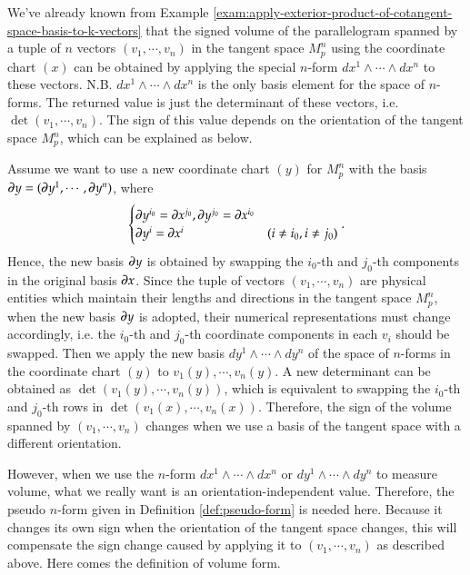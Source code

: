 \documentclass[11pt, a4paper]{book}
\begin{document}
We've already known from Example
\ref{exam:apply-exterior-product-of-cotangent-space-basis-to-k-vectors} that the signed
volume of the parallelogram spanned by a tuple of $n$ vectors $(v_1,\cdots,v_n)$ in the
tangent space $M_{p}^n$ using the coordinate chart $(x)$ can be obtained by applying
the special $n$-form $dx^1 \wedge \cdots \wedge dx^n$ to these vectors. N.B.
$dx^1 \wedge \cdots \wedge dx^n$ is the only basis element for the space of $n$-forms. The
returned value is just the determinant of these vectors, i.e. $\det(v_1,\cdots,v_n)$. The
sign of this value depends on the orientation of the tangent space $M_p^n$, which can
be explained as below.

Assume we want to use a new coordinate chart $(y)$ for $M_{p}^n$ with the basis
$\boldsymbol{\partial}y = (\boldsymbol{\partial}y^1,\cdots,\boldsymbol{\partial}y^n)$, where
\begin{equation*}
  \begin{cases}
    \boldsymbol{\partial}y^{i_0} = \boldsymbol{\partial}x^{j_0}, \boldsymbol{\partial}y^{j_0} =
    \boldsymbol{\partial}x^{i_0} \\
    \boldsymbol{\partial}y^i = \boldsymbol{\partial}x^i & (i \neq i_0, i\neq j_0)
  \end{cases}.
\end{equation*}
Hence, the new basis $\boldsymbol{\partial}y$ is obtained by swapping the $i_0$-th and $j_0$-th
components in the original basis $\boldsymbol{\partial}x$. Since the tuple of vectors
$(v_1,\cdots,v_n)$ are physical entities which maintain their lengths and directions in
the tangent space $M_p^n$, when the new basis $\boldsymbol{\partial}y$ is adopted, their numerical
representations must change accordingly, i.e. the $i_0$-th and $j_0$-th coordinate
components in each $v_i$ should be swapped. Then we apply the new basis
$dy^1 \wedge \cdots \wedge dy^n$ of the space of $n$-forms in the coordinate chart $(y)$
to $v_1(y),\cdots,v_n(y)$. A new determinant can be obtained as
$\det(v_1(y),\cdots,v_n(y))$, which is equivalent to swapping the $i_0$-th and $j_0$-th
rows in $\det(v_1(x),\cdots,v_n(x))$. Therefore, the sign of the volume spanned by
$(v_1,\cdots,v_n)$ changes when we use a basis of the tangent space with a different
orientation.

However, when we use the $n$-form $dx^1 \wedge \cdots \wedge dx^n$ or
$dy^1 \wedge \cdots \wedge dy^n$ to measure volume, what we really want is an
orientation-independent value. Therefore, the pseudo $n$-form given in Definition
\ref{def:pseudo-form} is needed here. Because it changes its own sign when the
orientation of the tangent space changes, this will compensate the sign change caused by
applying it to $(v_1,\cdots,v_n)$ as described above. Here comes the definition of
volume form.
\end{document}
